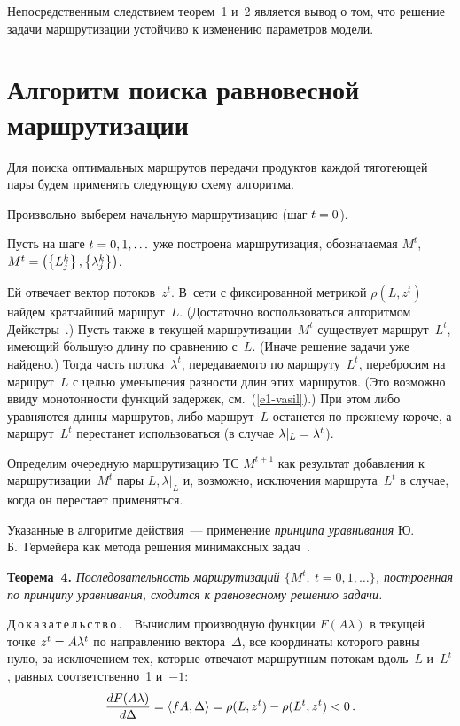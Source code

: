 \begin{multicols}{2}
  \smallskip
  
  Непосредственным следствием теорем~1 и~2 является вывод о том, что решение 
задачи маршрутизации устойчиво к изменению параметров мо\-дели.
   
  \section{Алгоритм поиска равновесной маршрутизации}
  
  Для поиска оптимальных маршрутов передачи продуктов каждой тяготеющей 
пары будем применять следующую схему алгоритма. 
  
  Произвольно выберем начальную маршрутизацию (шаг $t\hm=0$).
  
  Пусть на шаге $t\hm=0,1,\ldots$ уже построена маршрутизация, обозначаемая 
$M^t$, $M^t\hm= \left( \left\{ L_j^k\right\},\left\{ \lambda_j^k\right\} \right)$.
  
  Ей отвечает вектор потоков~$z^t$. В~сети с фиксированной метрикой 
$\rho(L,z^t)$ найдем кратчайший маршрут~$L$. (Достаточно воспользоваться 
алгоритмом Дейкстры~\cite{14-vasil}.) Пусть также в текущей 
маршрутизации~$M^t$ существует маршрут~$L^t$, имеющий б$\acute{\mbox{о}}$льшую длину по 
сравнению с~$L$. (Иначе решение задачи уже найдено.) Тогда часть 
потока~$\lambda^t$, передаваемого по маршруту~$L^t$, перебросим на 
маршрут~$L$ с целью уменьшения разности длин этих маршрутов. (Это возможно 
ввиду монотонности функций задержек, см.~(\ref{e1-vasil}).) При этом либо 
уравняются длины маршрутов, либо маршрут~$L$ останется по-прежнему короче, а 
маршрут~$L^t$ перестанет использоваться (в случае 
$\lambda\vert_L\hm=\lambda^t$).
  
  Определим очередную маршрутизацию ТС $M^{t+1}$ как результат добавления к 
маршрутизации~$M^t$ пары $L,\lambda\vert_L$ и, возможно, исключения 
маршрута~$L^t$ в случае, когда он перестает применяться. 
  
  Указанные в алгоритме действия~--- применение \textit{принципа уравнивания} 
Ю.\,Б.~Гермейера как метода решения минимаксных задач~\cite{15-vasil}. 
  
  \smallskip
  
  \noindent
  \textbf{Теорема~4.} \textit{Последовательность маршрутизаций $\{M^t,\ 
t=0,1,\ldots\}$, построенная по принципу уравнивания, сходится к равновесному 
решению задачи.}
  
  \smallskip
  
  \noindent
  Д\,о\,к\,а\,з\,а\,т\,е\,л\,ь\,с\,т\,в\,о\,.\ \ Вычислим производную функции 
$F(A\lambda)$ в текущей точке $z^t\hm= A\lambda^t$ по на\-прав\-ле\-нию 
вектора~$\Delta$, все координаты которого равны нулю, за исключением тех, 
которые отвечают маршрутным потокам вдоль~$L$ и~$L^t$, равных 
соответственно~1 и~$-1$:
  $$
  \displaystyle\frac{\displaystyle dF(A\lambda)\mathstrut}{\displaystyle d\Delta\mathstrut} =\left\langle fA,\Delta\right\rangle=\rho(L,z^t)-
\rho(L^t,z^t)<0\,.
  $$
  

\end{multicols}
